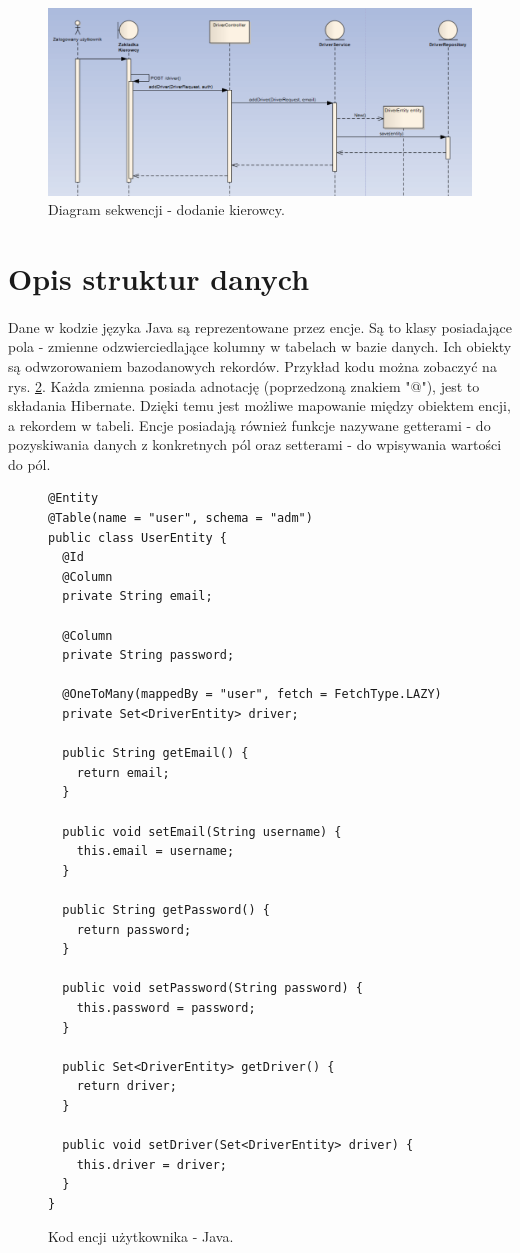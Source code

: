 \begin{figure}
	\centering
	\includegraphics[width=1\textwidth]{./graf/sequence_diagram.png}
	\caption{Diagram sekwencji - dodanie kierowcy.}
	\label{sequence_diagram}
\end{figure}

\section{Opis struktur danych}
\paragraph{}
Dane w kodzie języka Java są reprezentowane przez encje. Są to klasy posiadające pola - zmienne odzwierciedlające kolumny w tabelach w bazie danych. Ich obiekty są odwzorowaniem bazodanowych rekordów. Przykład kodu można zobaczyć na rys. \ref{fig:kod:encja}. Każda zmienna posiada adnotację (poprzedzoną znakiem "@"), jest to składania Hibernate. Dzięki temu jest możliwe mapowanie między obiektem encji, a rekordem w tabeli. Encje posiadają również funkcje nazywane getterami - do pozyskiwania danych z konkretnych pól oraz setterami - do wpisywania wartości do pól.

\begin{figure}
\centering
\begin{lstlisting}
@Entity
@Table(name = "user", schema = "adm")
public class UserEntity {
  @Id
  @Column
  private String email;

  @Column
  private String password;

  @OneToMany(mappedBy = "user", fetch = FetchType.LAZY)
  private Set<DriverEntity> driver;

  public String getEmail() {
    return email;
  }

  public void setEmail(String username) {
    this.email = username;
  }

  public String getPassword() {
    return password;
  }

  public void setPassword(String password) {
    this.password = password;
  }

  public Set<DriverEntity> getDriver() {
    return driver;
  }

  public void setDriver(Set<DriverEntity> driver) {
    this.driver = driver;
  }
}
\end{lstlisting}
\caption{Kod encji użytkownika - Java.}
\label{fig:kod:encja}
\end{figure}

